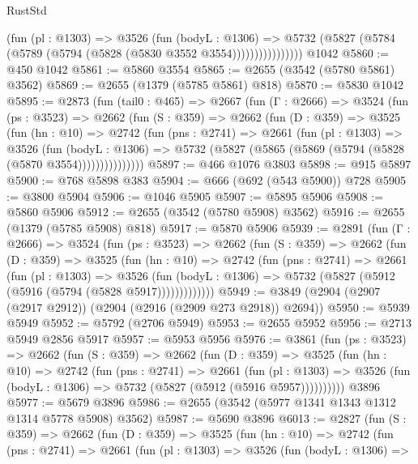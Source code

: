\begin{lexlean}{RustStd}
\begin{coremodule}
                    (fun (pl : @1303) =>
                    @3526
                      (fun (bodyL : @1306) =>
                      @5732 (@5827 (@5784 (@5789 (@5794 (@5828 (@5830 @3552 @3554))))))))))))))))
    @1042
@5860 := @450 @1042
@5861 := @5860 @3554
@5865 := @2655 (@3542 (@5780 @5861) @3562)
@5869 := @2655 (@1379 (@5785 @5861) @818)
@5870 := @5830 @1042
@5895 := @2873
    (fun (tail0 : @465) =>
    @2667
      (fun (Γ : @2666) =>
      @3524
        (fun (ps : @3523) =>
        @2662
          (fun (S : @359) =>
          @2662
            (fun (D : @359) =>
            @3525
              (fun (hn : @10) =>
              @2742
                (fun (pns : @2741) =>
                @2661
                  (fun (pl : @1303) =>
                  @3526
                    (fun (bodyL : @1306) =>
                    @5732 (@5827 (@5865 (@5869 (@5794 (@5828 (@5870 @3554)))))))))))))))
@5897 := @466 @1076 @3803
@5898 := @915 @5897
@5900 := @768 @5898 @383
@5904 := @666 (@692 (@543 @5900)) @728
@5905 := @3800 @5904
@5906 := @1046 @5905
@5907 := @5895 @5906
@5908 := @5860 @5906
@5912 := @2655 (@3542 (@5780 @5908) @3562)
@5916 := @2655 (@1379 (@5785 @5908) @818)
@5917 := @5870 @5906
@5939 := @2891
    (fun (Γ : @2666) =>
    @3524
      (fun (ps : @3523) =>
      @2662
        (fun (S : @359) =>
        @2662
          (fun (D : @359) =>
          @3525
            (fun (hn : @10) =>
            @2742
              (fun (pns : @2741) =>
              @2661
                (fun (pl : @1303) =>
                @3526
                  (fun (bodyL : @1306) =>
                  @5732 (@5827 (@5912 (@5916 (@5794 (@5828 @5917)))))))))))))
@5949 := @3849 (@2904 (@2907 (@2917 @2912)) (@2904 (@2916 (@2909 @273 @2918)) @2694))
@5950 := @5939 @5949
@5952 := @5792 (@2706 @5949)
@5953 := @2655 @5952
@5956 := @2713 @5949 @2856 @5917
@5957 := @5953 @5956
@5976 := @3861
    (fun (ps : @3523) =>
    @2662
      (fun (S : @359) =>
      @2662
        (fun (D : @359) =>
        @3525
          (fun (hn : @10) =>
          @2742
            (fun (pns : @2741) =>
            @2661
              (fun (pl : @1303) =>
              @3526 (fun (bodyL : @1306) => @5732 (@5827 (@5912 (@5916 @5957))))))))))
    @3896
@5977 := @5679 @3896
@5986 := @2655 (@3542 (@5977 @1341 @1343 @1312 @1314 @5778 @5908) @3562)
@5987 := @5690 @3896
@6013 := @2827
    (fun (S : @359) =>
    @2662
      (fun (D : @359) =>
      @3525
        (fun (hn : @10) =>
        @2742
          (fun (pns : @2741) =>
          @2661
            (fun (pl : @1303) =>
            @3526
              (fun (bodyL : @1306) =>

\end{coremodule}
\end{lexlean}
